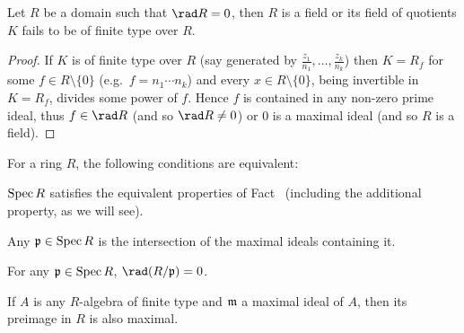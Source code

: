 \documentclass[a4paper,parskip=half,numbers=enddot, DIV=12]{scrreprt}
\begin{document}
\begin{lem}
    Let $R$ be a domain such that $\rad R = 0$, then $R$ is a field or its field of quotients $K$ fails to be of finite type over $R$.
\end{lem}
\begin{proof}
    If $K$ is of finite type over $R$ (say generated by $\frac{z_1}{n_1},\ldots,\frac{z_k}{n_k}$) then $K= R_f$ for some $f\in R\setminus \{0\}$ (e.g.\ $f = n_1\cdots n_k$) and every $x\in R\setminus \{0\}$, being invertible in $K=R_f$, divides some power of $f$. Hence $f$ is contained in any non-zero prime ideal, thus $f\in\rad R$ (and so $\rad R\neq 0$) or $0$ is a maximal ideal (and so $R$ is a field).
\end{proof}
\begin{prop}
    For a ring $R$, the following conditions are equivalent:
    \begin{alphanumerate}
    \item 
        $\operatorname{Spec} R$ satisfies the equivalent properties of Fact~ (including the additional property, as we will see).
    \item  
        Any $\mathfrak{p}\in \operatorname{Spec} R$ is the intersection of the maximal ideals containing it.
    \item 
        For any $\mathfrak{p}\in \operatorname{Spec} R$, $\rad(R/\pp) = 0$.
    \item  
        If $A$ is any $R$-algebra of finite type and $\mathfrak{m}$ a maximal ideal of $A$, then its preimage in $R$ is also maximal.
    \end{alphanumerate}
\end{prop}
\end{document}
